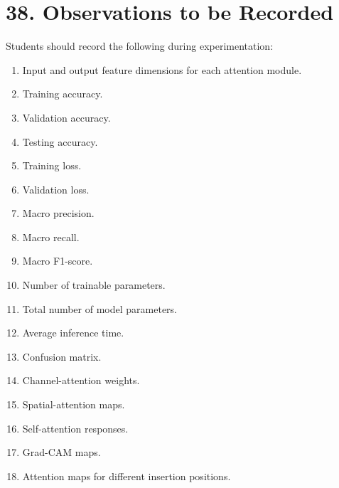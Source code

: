 \documentclass[10pt]{article}
\begin{document}
\section*{38. Observations to be Recorded}

Students should record the following during experimentation:

\begin{enumerate}

\item Input and output feature dimensions for each attention module.

\item Training accuracy.

\item Validation accuracy.

\item Testing accuracy.

\item Training loss.

\item Validation loss.

\item Macro precision.

\item Macro recall.

\item Macro F1-score.

\item Number of trainable parameters.

\item Total number of model parameters.

\item Average inference time.

\item Confusion matrix.

\item Channel-attention weights.

\item Spatial-attention maps.

\item Self-attention responses.

\item Grad-CAM maps.

\item Attention maps for different insertion positions.

\end{enumerate}
\end{document}
